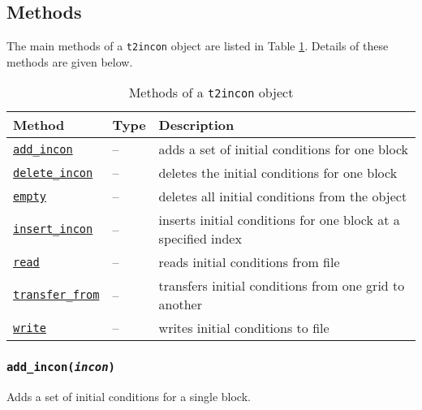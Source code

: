 \subsection{Methods}

The main methods of a \texttt{t2incon} object are listed in Table \ref{tb:t2incon_methods}.  Details of these methods are given below.

\begin{table}
  \begin{center}
    \begin{tabular}{|l|l|p{65mm}|}
      \hline
      \textbf{Method} & \textbf{Type} & \textbf{Description}\\
      \hline
      \hyperref[sec:t2incon:add_incon]{\texttt{add\_incon}} & -- & adds a set of initial conditions for one block\\
      \hyperref[sec:t2incon:delete_incon]{\texttt{delete\_incon}} & -- & deletes the initial conditions for one block\\
      \hyperref[sec:t2incon:empty]{\texttt{empty}} & -- & deletes all initial conditions from the object\\
      \hyperref[sec:t2incon:insert_incon]{\texttt{insert\_incon}} & -- & inserts initial conditions for one block at a specified index\\
      \hyperref[sec:t2incon:read]{\texttt{read}} & -- & reads initial conditions from file\\
      \hyperref[sec:t2incon:transfer_from]{\texttt{transfer\_from}} & -- & transfers initial conditions from one grid to another\\
      \hyperref[sec:t2incon:write]{\texttt{write}} & -- & writes initial conditions to file\\
      \hline
    \end{tabular}
    \caption{Methods of a \texttt{t2incon} object}
    \label{tb:t2incon_methods}
  \end{center}
\end{table}

\begin{snugshade}
\subsubsection{\texttt{add\_incon(\emph{incon})}}
\end{snugshade}
\label{sec:t2incon:add_incon}

Adds a set of initial conditions for a single block.

